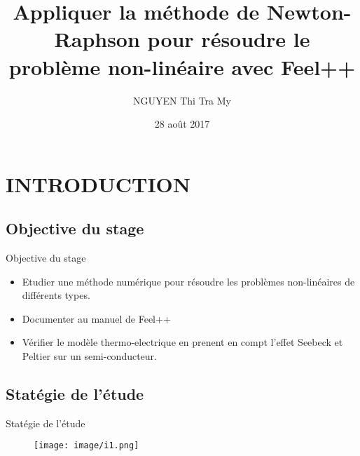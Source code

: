 \documentclass[11pt]{beamer}
\title[STAGE DE M1 2017]{\textbf{Appliquer la méthode de Newton-Raphson pour résoudre le problème non-linéaire avec Feel++}}
\author{NGUYEN Thi Tra My}
\institute[CSMI-M1]{Stage de M1}
\date{28 août 2017}
\begin{document}
\begin{frame}
\titlepage
\end{frame}
\begin{frame}
\frametitle{}
\tableofcontents
\end{frame}




\section{INTRODUCTION}
\subsection{Objective du stage}


\begin{frame}{Objective du stage}
\begin{itemize}
\item Etudier une méthode numérique pour résoudre les problèmes non-linéaires de différents types.\\


\item Documenter au manuel de Feel++\\


\item Vérifier le modèle thermo-electrique en prenent en compt l’effet Seebeck et Peltier sur un semi-conducteur.\\


\end{itemize}
\end{frame}




\subsection{Statégie de l'étude}

\begin{frame}{Statégie de l'étude}

\begin{itemize}
\begin{figure}
\texttt{[image: image/i1.png]}
\end{figure}
 

\end{itemize}
\end{frame}
\end{document}
